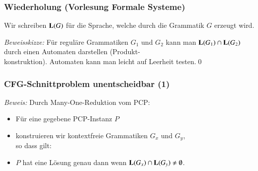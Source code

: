 \documentclass[onlymath]{beamer}
\begin{document}
\begin{frame}\frametitle{Wiederholung (Vorlesung Formale Systeme)}

Wir schreiben $\textbf{\textcolor{black}{L}}(G)$ für die Sprache, welche durch die Grammatik $G$ erzeugt wird.\bigskip

\pause\emph{Beweisskizze:} Für reguläre Grammatiken $G_1$ und $G_2$ kann man $\textbf{\textcolor{black}{L}}(G_1)\cap\textbf{\textcolor{black}{L}}(G_2)$ durch einen Automaten darstellen (Produkt-\\konstruktion). Automaten kann man leicht auf Leerheit testen.\qed\bigskip\pause


\end{frame}

\begin{frame}\frametitle{CFG-Schnittproblem unentscheidbar (1)}


\pause\emph{Beweis:} Durch Many-One-Reduktion vom PCP:\pause\medskip

\begin{itemize}
\item Für eine gegebene PCP-Instanz $P$
\item konstruieren wir kontextfreie Grammatiken $G_x$ und $G_y$,\\[1ex]
	so dass gilt:
\item $P$ hat eine Lösung genau dann wenn $\textbf{\textcolor{black}{L}}(G_x)\cap\textbf{\textcolor{black}{L}}(G_y)\neq\emptyset$.
\end{itemize}

\end{frame}
\end{document}
